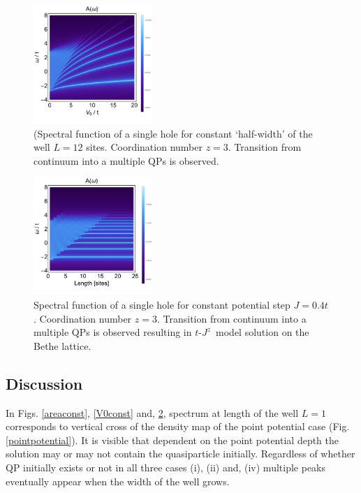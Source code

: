 \documentclass[%
 reprint,
 amsmath,amssymb,
 aps,
prb,
floatfix,
]{revtex4-1}
\begin{document}
\begin{figure}[ht!]
\includegraphics[width=0.4\textwidth]{Widthconst}
    \caption{(Spectral function of a single hole for constant `half-width' of the well $L = 12$ sites. Coordination number $z = 3$. Transition from continuum into a multiple QPs is observed.}\label{widthconst}
\end{figure}

\begin{figure}[ht!]
\includegraphics[width=0.4\textwidth]{Stepconst}
    \caption{Spectral function of a single hole for constant potential step $J = 0.4t$. Coordination number $z = 3$. Transition from continuum into a multiple QPs is observed resulting in $t\text{-}J^z$~model solution on the Bethe lattice.}\label{stepconst}
\end{figure}

\subsection{Discussion}
In Figs. \ref{areaconst}, \ref{V0const} and, \ref{stepconst}, spectrum at length of the well $L = 1$ corresponds to vertical cross of the density map of the point potential case (Fig. \ref{pointpotential}). It is visible that dependent on the point potential depth the solution may or may not contain the quasiparticle initially. Regardless of whether QP initially exists or not in all three cases (i), (ii) and, (iv) multiple peaks eventually appear when the width of the well grows. 
\end{document}

